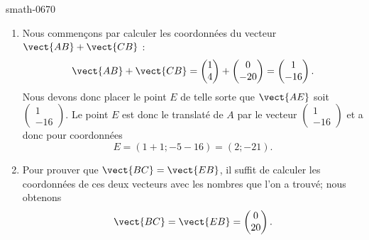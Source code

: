 \begin{corrige}{smath-0670}
\begin{enumerate}
        \item
            Nous commençons par calculer les coordonnées du vecteur \( \vect{ AB }+\vect{ CB }\) :
            \begin{equation}
                \vect{ AB }+\vect{ CB }=\begin{pmatrix}
                    1    \\ 
                    4    
                \end{pmatrix}+\begin{pmatrix}
                    0    \\ 
                    -20
                \end{pmatrix}=\begin{pmatrix}
                    1    \\ 
                    -16    
                \end{pmatrix}.
            \end{equation}
            Nous devons donc placer le point \( E\) de telle sorte que \( \vect{ AE }\) soit \( \begin{pmatrix}
                1    \\ 
                -16    
            \end{pmatrix}\). Le point \( E\) est donc le translaté de \( A\) par le vecteur \( \begin{pmatrix}
                1    \\ 
                -16    
            \end{pmatrix}\) et a donc pour coordonnées
            \begin{equation}
                E=(1+1;-5-16)=(2;-21).
            \end{equation}
        \item
            Pour prouver que \( \vect{ BC }=\vect{ EB }\), il suffit de calculer les coordonnées de ces deux vecteurs avec les nombres que l'on a trouvé; nous obtenons
            \begin{equation}
                \vect{ BC }=\vect{ EB }=\begin{pmatrix}
                    0    \\ 
                    20    
                \end{pmatrix}.
            \end{equation}
            

\end{enumerate}
\end{corrige}
